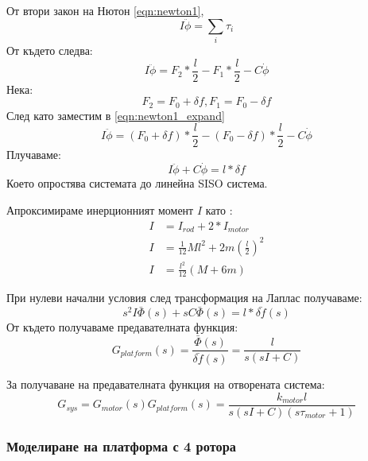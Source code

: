 От втори закон на Нютон \autoref{eqn:newton1}, 
\begin{equation}
    I \ddot{\phi} = \sum_i \tau_i
    \label{eqn:newton1}
\end{equation}
От където следва:
\begin{equation}
    I \ddot{\phi} = F_2*\frac{l}{2} - F_1*\frac{l}{2} - C \dot{\phi}
    \label{eqn:newton1_expand}
\end{equation}
Нека:
\begin{equation}
    F_2 = F_0 + \delta f, F_1 = F_0 - \delta f 
\end{equation}
След като заместим в \autoref{eqn:newton1_expand}
\begin{equation}
    I \ddot{\phi} = (F_0 + \delta f)*\frac{l}{2} - (F_0 - \delta f)*\frac{l}{2} - C \dot{\phi}
\end{equation}
Плучаваме:
\begin{equation}
    I \ddot{\phi} + C \dot{\phi} = l * \delta f
\end{equation}
Което опростява системата до линейна SISO система.

Апроксимираме инерционният момент \(I\) като :
\begin{align}
    I &= I_{rod} + 2*I_{motor}\\
    I &= \frac{1}{12}Ml^2 + 2m(\frac{l}{2})^2 \\
    I &= \frac{l^2}{12}(M + 6m)
\end{align}

При нулеви начални условия след трансформация на Лаплас получаваме:
\begin{equation}
    s^2 I \bar{\Phi}(s) + s C \bar{\Phi}(s) = l * \bar{\delta f}(s) 
\end{equation}
От където получаваме предавателната функция:
\begin{equation}
    G_{platform}(s) = \frac{\bar{\Phi}(s)}{\bar{\delta f }(s)} = \frac{l}{s ( s I + C)}
\end{equation}

За получаване на предавателната функция на отворената система:
\begin{equation}
    G_{sys} = G_{motor}(s)G_{platform}(s) = 
    \frac{k_{motor} l}{s( s I + C)(s \tau_{motor} + 1)} 
\end{equation}


\subsubsection{Моделиране на платформа с 4 ротора}

